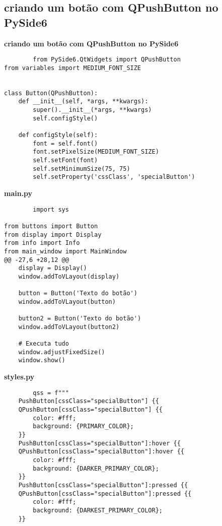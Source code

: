 \documentclass[12pt,a4paper]{article}
\begin{document}
    \subsection{ criando um botão com QPushButton no PySide6}
    \textbf{ criando um botão com QPushButton no PySide6}
    \begin{lstlisting}
        from PySide6.QtWidgets import QPushButton
from variables import MEDIUM_FONT_SIZE


class Button(QPushButton):
    def __init__(self, *args, **kwargs):
        super().__init__(*args, **kwargs)
        self.configStyle()

    def configStyle(self):
        font = self.font()
        font.setPixelSize(MEDIUM_FONT_SIZE)
        self.setFont(font)
        self.setMinimumSize(75, 75)
        self.setProperty('cssClass', 'specialButton')
    \end{lstlisting}

    \textbf{main.py}

    \begin{lstlisting}
        import sys

from buttons import Button
from display import Display
from info import Info
from main_window import MainWindow
@@ -27,6 +28,12 @@
    display = Display()
    window.addToVLayout(display)

    button = Button('Texto do botão')
    window.addToVLayout(button)

    button2 = Button('Texto do botão')
    window.addToVLayout(button2)

    # Executa tudo
    window.adjustFixedSize()
    window.show()
    \end{lstlisting}
    \textbf{styles.py}
    \begin{lstlisting}
        qss = f"""
    PushButton[cssClass="specialButton"] {{
    QPushButton[cssClass="specialButton"] {{
        color: #fff;
        background: {PRIMARY_COLOR};
    }}
    PushButton[cssClass="specialButton"]:hover {{
    QPushButton[cssClass="specialButton"]:hover {{
        color: #fff;
        background: {DARKER_PRIMARY_COLOR};
    }}
    PushButton[cssClass="specialButton"]:pressed {{
    QPushButton[cssClass="specialButton"]:pressed {{
        color: #fff;
        background: {DARKEST_PRIMARY_COLOR};
    }}
    \end{lstlisting}
\end{document}
